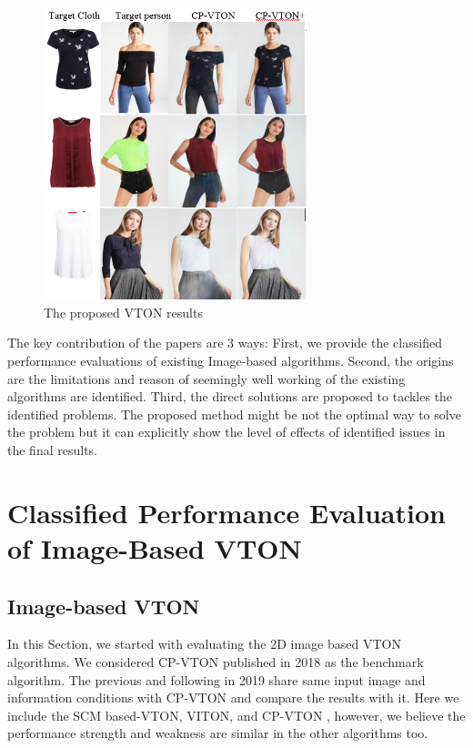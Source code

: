 \documentclass[runningheads]{llncs}
\begin{document}
\begin{figure}
\centering
\includegraphics[height=8.5cm, scale=1]{figures/cpvton_cpvton+keyresult.png}   %
\caption{The proposed VTON results}
\label{fig:cpvton_cpvton+keyresult}
\end{figure}

The key contribution of the papers are 3 ways: First, we provide the classified performance evaluations of existing Image-based algorithms. Second, the origins are the limitations and reason of seemingly well working of the existing algorithms are  identified. Third, the direct solutions are proposed to tackles the identified problems. The proposed method might be not the optimal way to solve the problem but it can explicitly show the level of effects of identified issues in the final results.


\section{Classified Performance Evaluation of Image-Based VTON}

\subsection{Image-based VTON}

In this Section, we started with evaluating the 2D image based VTON algorithms. We considered CP-VTON \cite{Wang2018TowardCI} published in 2018 as the benchmark algorithm. The previous and following in 2019 share same input image and information conditions with CP-VTON and compare the results with it. Here we include the SCM based-VTON, VITON\cite{Han2017VITONAI}, and  CP-VTON \cite{Wang2018TowardCI}, however, we believe the performance strength and weakness are similar in the other algorithms too.
\end{document}
